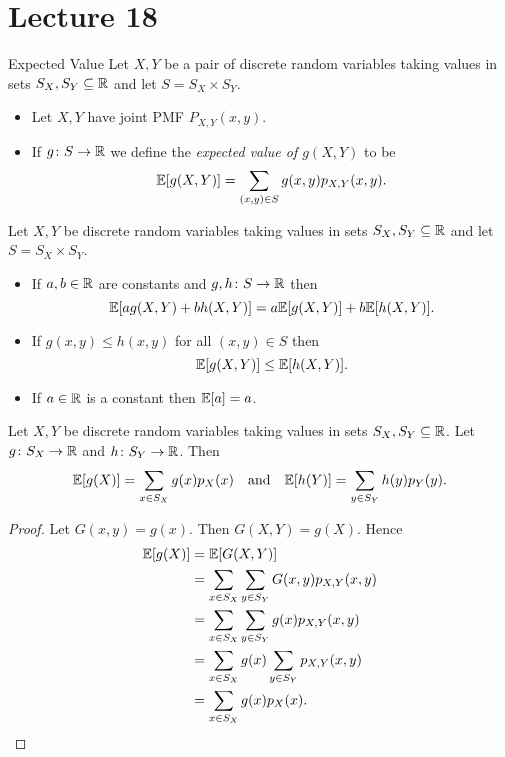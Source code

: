 \documentclass[class=article, crop=false]{standalone}
\begin{document}
  \section{Lecture 18}
  \begin{definition}{Expected Value}
    Let $X, Y$ be a pair of discrete random variables taking values in sets $S_X, S_Y\subseteq\mathbb{R}$ and let $S = S_X\times S_Y$.
    \begin{itemize}
      \item Let $X, Y$ have joint PMF $P_{X, Y}(x, y)$.
      \item If $g\colon S\to \mathbb{R}$ we define the \emph{expected value of $g(X, Y)$} to be
      \[
        \mathbb{E}[g(X, Y)] = \sum_{(x, y)\in S}g(x, y)p_{X, Y}(x, y).
      \]
    \end{itemize}
  \end{definition}
  \begin{theorem}{}
    Let $X, Y$ be discrete random variables taking values in sets $S_X, S_Y\subseteq\mathbb{R}$ and let $S = S_X\times S_Y$.
    \begin{itemize}
      \item If $a, b\in\mathbb{R}$ are constants and $g, h\colon S\to \mathbb{R}$ then
      \[
        \mathbb{E}[ag(X, Y) + bh(X, Y)] = a\mathbb{E}[g(X, Y)] + b\mathbb{E}[h(X, Y)].
      \]
      \item If $g(x, y) \leq h(x, y)$ for all $(x, y)\in S$ then
      \[
        \mathbb{E}[g(X, Y)] \leq \mathbb{E}[h(X, Y)].
      \]
      \item If $a\in\mathbb{R}$ is a constant then $\mathbb{E}[a] = a$.
    \end{itemize}
  \end{theorem}
  \begin{theorem}{}
    Let $X, Y$ be discrete random variables taking values in sets $S_X, S_Y\subseteq\mathbb{R}$. Let $g\colon S_X\to \mathbb{R}$ and $h\colon S_Y\to \mathbb{R}$. Then
    \[
      \mathbb{E}[g(X)] = \sum_{x\in S_X} g(x)p_X(x)\quad\text{and}\quad \mathbb{E}[h(Y)] = \sum_{y\in S_Y} h(y)p_Y(y).
    \]
    \begin{proof}
      Let $G(x, y) = g(x)$. Then $G(X, Y) = g(X)$. Hence
      \begin{align*}
        \mathbb{E}[g(X)] &= \mathbb{E}[G(X, Y)] \\
                 &= \sum_{x\in S_X}\sum_{y\in S_Y} G(x, y)p_{X, Y}(x, y) \\
                 &= \sum_{x\in S_X}\sum_{y\in S_Y} g(x)p_{X, Y}(x, y) \\
                 &= \sum_{x\in S_X}g(x)\sum_{y\in S_Y} p_{X, Y}(x, y) \\
                 &= \sum_{x\in S_X}g(x)p_X(x).
      \end{align*}
    \end{proof}
  \end{theorem}
\end{document}
